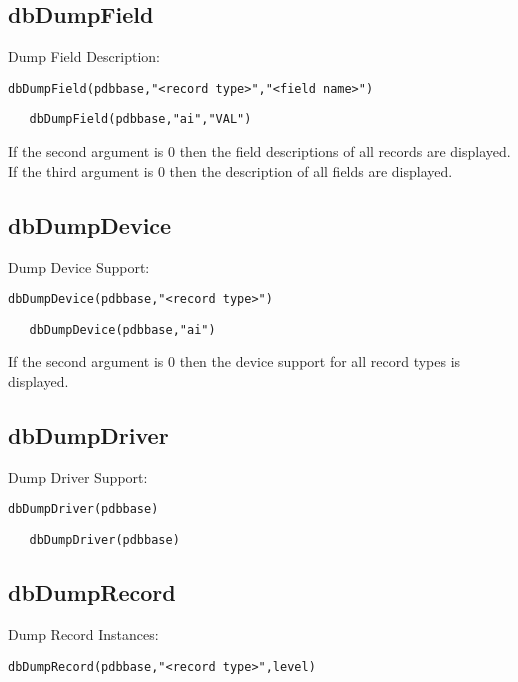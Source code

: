 \subsection{dbDumpField}

Dump Field Description:

\begin{verbatim}dbDumpField(pdbbase,"<record type>","<field name>")
\end{verbatim}

\begin{verbatim}   dbDumpField(pdbbase,"ai","VAL")
\end{verbatim}If the second argument is 0 then the field descriptions of all records are displayed. If the third argument is 0 then the 
description of all fields are displayed.

\subsection{dbDumpDevice}

Dump Device Support:

\begin{verbatim}dbDumpDevice(pdbbase,"<record type>")
\end{verbatim}

\begin{verbatim}   dbDumpDevice(pdbbase,"ai")
\end{verbatim}If the second argument is 0 then the device support for all record types is displayed.

\subsection{dbDumpDriver}

Dump Driver Support:

\begin{verbatim}dbDumpDriver(pdbbase)
\end{verbatim}

\begin{verbatim}   dbDumpDriver(pdbbase)
\end{verbatim}\subsection{dbDumpRecord}

Dump Record Instances:

\begin{verbatim}dbDumpRecord(pdbbase,"<record type>",level)
\end{verbatim}

